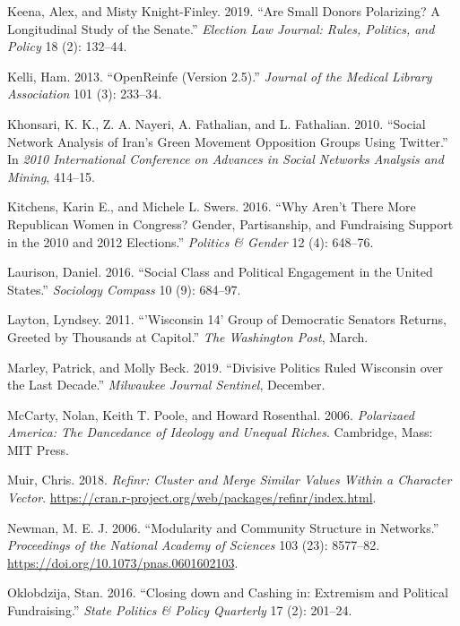 \documentclass[12pt,]{article}
\begin{document}
\leavevmode\hypertarget{ref-keena2019}{}%
Keena, Alex, and Misty Knight-Finley. 2019. ``Are Small Donors
Polarizing? A Longitudinal Study of the Senate.'' \emph{Election Law
Journal: Rules, Politics, and Policy} 18 (2): 132--44.

\leavevmode\hypertarget{ref-openrefine}{}%
Kelli, Ham. 2013. ``OpenReinfe (Version 2.5).'' \emph{Journal of the
Medical Library Association} 101 (3): 233--34.

\leavevmode\hypertarget{ref-khonsari2010}{}%
Khonsari, K. K., Z. A. Nayeri, A. Fathalian, and L. Fathalian. 2010.
``Social Network Analysis of Iran's Green Movement Opposition Groups
Using Twitter.'' In \emph{2010 International Conference on Advances in
Social Networks Analysis and Mining}, 414--15.

\leavevmode\hypertarget{ref-kitchens2016}{}%
Kitchens, Karin E., and Michele L. Swers. 2016. ``Why Aren't There More
Republican Women in Congress? Gender, Partisanship, and Fundraising
Support in the 2010 and 2012 Elections.'' \emph{Politics \& Gender} 12
(4): 648--76.

\leavevmode\hypertarget{ref-laurison2016}{}%
Laurison, Daniel. 2016. ``Social Class and Political Engagement in the
United States.'' \emph{Sociology Compass} 10 (9): 684--97.

\leavevmode\hypertarget{ref-layton2011}{}%
Layton, Lyndsey. 2011. ``'Wisconsin 14' Group of Democratic Senators
Returns, Greeted by Thousands at Capitol.'' \emph{The Washington Post},
March.

\leavevmode\hypertarget{ref-marley2019}{}%
Marley, Patrick, and Molly Beck. 2019. ``Divisive Politics Ruled
Wisconsin over the Last Decade.'' \emph{Milwaukee Journal Sentinel},
December.

\leavevmode\hypertarget{ref-mccarty2006}{}%
McCarty, Nolan, Keith T. Poole, and Howard Rosenthal. 2006.
\emph{Polarizaed America: The Dancedance of Ideology and Unequal
Riches}. Cambridge, Mass: MIT Press.

\leavevmode\hypertarget{ref-refinr}{}%
Muir, Chris. 2018. \emph{Refinr: Cluster and Merge Similar Values Within
a Character Vector}.
\url{https://cran.r-project.org/web/packages/refinr/index.html}.

\leavevmode\hypertarget{ref-newman2006}{}%
Newman, M. E. J. 2006. ``Modularity and Community Structure in
Networks.'' \emph{Proceedings of the National Academy of Sciences} 103
(23): 8577--82. \url{https://doi.org/10.1073/pnas.0601602103}.

\leavevmode\hypertarget{ref-oklobzija}{}%
Oklobdzija, Stan. 2016. ``Closing down and Cashing in: Extremism and
Political Fundraising.'' \emph{State Politics \& Policy Quarterly} 17
(2): 201--24.
\end{document}
